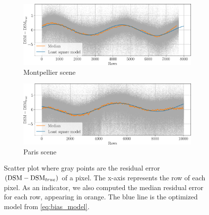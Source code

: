\begin{figure}
    \begin{subfigure}[t]{\linewidth}
        \centering
        \includegraphics[width=\linewidth]{Images/Chap_6/vibration_bias_Montpellier.png}
        \caption{Montpellier scene}
        \label{fig:vibration_bias_Montpellier}
    \end{subfigure}
    \begin{subfigure}[t]{\linewidth}
        \centering
        \includegraphics[width=\linewidth]{Images/Chap_6/vibration_bias_Paris.png}
        \caption{Paris scene}
        \label{fig:vibration_bias_Paris}
    \end{subfigure}
    \caption{Scatter plot where gray points are the residual error $(\mathrm{DSM}-\mathrm{DSM}_{true})$ of a pixel. The x-axis represents the row of each pixel. As an indicator, we also computed the median residual error for each row, appearing in orange. The blue line is the optimized model from \cref{eq:bias_model}.}
    \label{fig:vibration_bias}
\end{figure}

